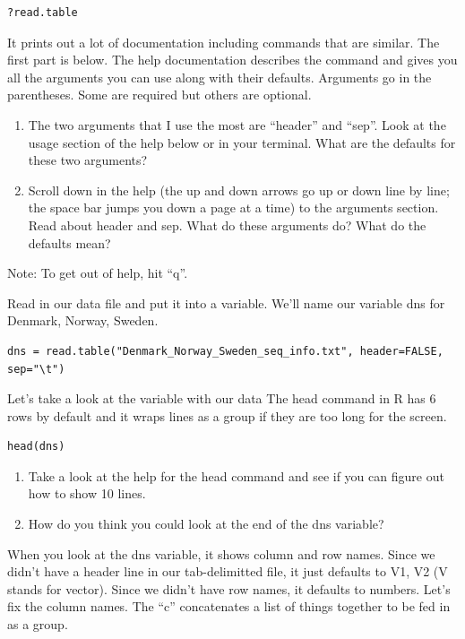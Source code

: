 \documentclass[
]{book}
\begin{document}
\begin{verbatim}
?read.table
\end{verbatim}

It prints out a lot of documentation including commands that are similar. The first part is below. The help documentation describes the command and gives you all the arguments you can use along with their defaults. Arguments go in the parentheses. Some are required but others are optional.

\begin{enumerate}
\def\labelenumi{\arabic{enumi}.}
\setcounter{enumi}{11}
\item
  The two arguments that I use the most are ``header'' and ``sep''. Look at the usage section of the help below or in your terminal. What are the defaults for these two arguments?
\item
  Scroll down in the help (the up and down arrows go up or down line by line; the space bar jumps you down a page at a time) to the arguments section. Read about header and sep. What do these arguments do? What do the defaults mean?
\end{enumerate}

Note: To get out of help, hit ``q''.

Read in our data file and put it into a variable. We'll name our variable dns for Denmark, Norway, Sweden.

\begin{verbatim}
dns = read.table("Denmark_Norway_Sweden_seq_info.txt", header=FALSE, sep="\t")
\end{verbatim}

Let's take a look at the variable with our data The head command in R has 6 rows by default and it wraps lines as a group if they are too long for the screen.

\begin{verbatim}
head(dns)
\end{verbatim}

\begin{enumerate}
\def\labelenumi{\arabic{enumi}.}
\setcounter{enumi}{13}
\item
  Take a look at the help for the head command and see if you can figure out how to show 10 lines.
\item
  How do you think you could look at the end of the dns variable?
\end{enumerate}

When you look at the dns variable, it shows column and row names. Since we didn't have a header line in our tab-delimitted file, it just defaults to V1, V2 (V stands for vector). Since we didn't have row names, it defaults to numbers. Let's fix the column names. The ``c'' concatenates a list of things together to be fed in as a group.
\end{document}
